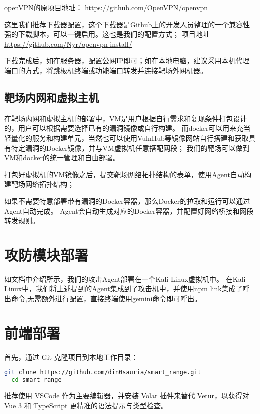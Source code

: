 \documentclass[lang=cn,10pt]{elegantbook}
\begin{document}
openVPN的原项目地址：
\href{https://github.com/OpenVPN/openvpn}{https://github.com/OpenVPN/openvpn}

这里我们推荐下载器配置，这个下载器是Github上的开发人员整理的一个兼容性强的下载脚本，可以一键启用。这也是我们的配置方式；
项目地址
\href{https://github.com/Nyr/openvpn-install/}{https://github.com/Nyr/openvpn-install/}

下载完成后，如在服务器，配置公网IP即可；如在本地电脑，建议采用本机代理端口的方式，将跳板机终端或功能端口转发并连接靶场外网机器。


\subsection{靶场内网和虚拟主机}

在靶场内网和虚拟主机的部署中，VM是用户根据自行需求和复现条件打包设计的，用户可以根据需要选择已有的漏洞镜像或自行构建。
而docker可以用来充当轻量化的服务和构建单元，当然也可以使用VulnHub等镜像网站自行搭建和获取具有特定漏洞的Docker镜像，并与VM虚拟机任意搭配网段；
我们的靶场可以做到VM和docker的统一管理和自由部署。

打包好虚拟机的VM镜像之后，提交靶场网络拓扑结构的表单，使用Agent自动构建靶场网络拓扑结构；

如果不需要特意部署带有漏洞的Docker容器，那么Docker的拉取和运行可以通过Agent自动完成。
Agent会自动生成对应的Docker容器，并配置好网络桥接和网段转发规则。



\section{攻防模块部署}

如文档中介绍所示，我们的攻击Agent部署在一个Kali Linux虚拟机中。
在Kali Linux中，我们将上述提到的Agent集成到了攻击机中，并使用npm link集成了呼出命令,无需额外进行配置，直接终端使用gemini命令即可呼出。


\section{前端部署}

首先，通过 Git 克隆项目到本地工作目录：
\begin{lstlisting}[language=bash]
  git clone https://github.com/din0sauria/smart_range.git
  cd smart_range
\end{lstlisting}

推荐使用 VSCode 作为主要编辑器，并安装 Volar 插件来替代 Vetur，以获得对 Vue 3 和 TypeScript 更精准的语法提示与类型检查。
\end{document}
